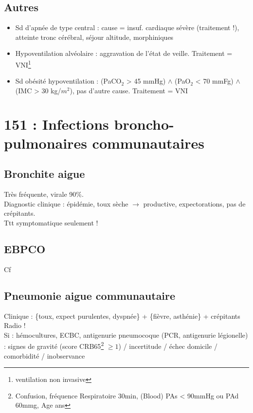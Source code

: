 \documentclass{article}
\begin{document}
\subsection{Autres}
\begin{itemize}
\item Sd d'apnée de type central : cause = {insuf. cardiaque sévère (traitement !),
    atteinte tronc cérébral, séjour altitude, morphiniques}
\item Hypoventilation alvéolaire : aggravation de l'état de veille. Traitement =
  VNI\footnote{ventilation non invasive}
\item Sd obésité hypoventilation : (PaCO\(_{\text{2}}\) > 45 mmHg) \(\wedge\) (PaO\(_{\text{2}}\) < 70 mmFg) \(\wedge\)
  (IMC > 30 kg/\(m^2\)), pas d'autre cause. Traitement = VNI
\end{itemize}

\section{151 : Infections broncho-pulmonaires communautaires}
\subsection{Bronchite aigue}
Très fréquente, virale 90\%. \\
Diagnostic clinique : épidémie, toux sèche \(\to\) productive, expectorations,
pas de crépitants.\\
Ttt symptomatique seulement !

\subsection{EBPCO} Cf~

\subsection{Pneumonie aigue communautaire}
Clinique : \{toux, expect purulentes, dyspnée\} + \{fièvre, asthénie\} +
crépitants\\
Radio !\\
Si \faHospitalO : hémocultures, ECBC, antigenurie pneumocoque (\pm PCR,
antigenurie légionelle)\\
\faHospitalO : signes de gravité (score CRB65\footnote{Confusion, fréquence
  Respiratoire \ge 30min, (Blood) PAs < 90mmHg ou PAd \ge 60mmg, Age  ans}
\(\ge 1\)) / incertitude / échec domicile / comorbidité / inobservance
\end{document}

